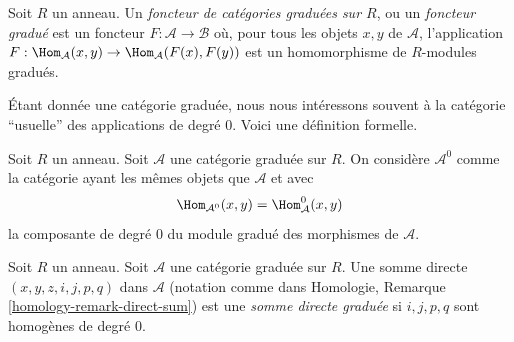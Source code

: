 \begin{definition}
\label{definition-functor-graded-categories}
Soit $R$ un anneau. Un {\it foncteur de catégories graduées sur $R$}, ou un {\it
foncteur gradué} est un foncteur $F : \mathcal{A} \to \mathcal{B}$ où, pour tous
les objets $x, y$ de $\mathcal{A}$, l'application $F : \Hom_\mathcal{A}(x, y) \to
\Hom_\mathcal{A}(F(x), F(y))$ est un homomorphisme de $R$-modules gradués.
\end{definition}

\noindent
Étant donnée une catégorie graduée, nous nous intéressons souvent à la catégorie
``usuelle'' des applications de degré $0$. Voici une définition formelle.

\begin{definition}
\label{definition-H0-of-graded-category}
Soit $R$ un anneau. Soit $\mathcal{A}$ une catégorie graduée sur $R$. On considère
{\it $\mathcal{A}^0$} comme la catégorie ayant les mêmes objets que $\mathcal{A}$
et avec
$$
\Hom_{\mathcal{A}^0}(x, y) = \Hom^0_\mathcal{A}(x, y)
$$
la composante de degré $0$ du module gradué des morphismes de $\mathcal{A}$.
\end{definition}

\begin{definition}
\label{definition-graded-direct-sum}
Soit $R$ un anneau. Soit $\mathcal{A}$ une catégorie graduée sur $R$. Une somme
directe $(x, y, z, i, j, p, q)$ dans $\mathcal{A}$ (notation comme dans Homologie,
Remarque \ref{homology-remark-direct-sum}) est une {\it somme directe graduée} si
$i, j, p, q$ sont homogènes de degré $0$.
\end{definition}

